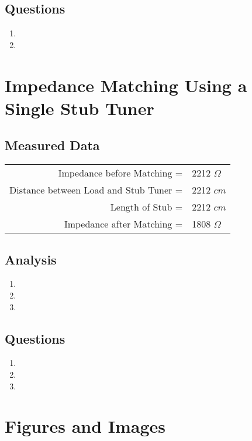 \documentclass{article}
\begin{document}
\subsection{Questions}
\begin{enumerate}
	\item
	\item
\end{enumerate}
\section{Impedance Matching Using a Single Stub Tuner}
\subsection{Measured Data}
\begin{table}[h]
\centering
	\begin{tabular}{rl}
	Impedance before Matching =   			 & 2212 $\Omega$  \\
	Distance between Load and Stub Tuner =   & 2212 $cm$  \\
	Length of Stub =   						 & 2212 $cm$  \\
	Impedance after Matching =  			 & 1808 $\Omega$      
	\end{tabular}
\end{table}
\subsection{Analysis}
\begin{enumerate}
	\item
	\item
	\item
\end{enumerate}
\subsection{Questions}
\begin{enumerate}
	\item
	\item
	\item
\end{enumerate}

\section{Figures and Images}
\end{document}
